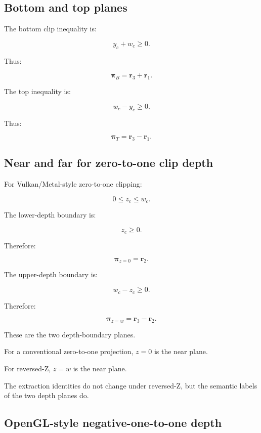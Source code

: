 \subsection{Bottom and top planes}\label{02-foundations-ii-ch034-bottom-and-top-planes}

\hypertarget{02-foundations-ii-ch034-bottom-and-top-planes}{}

The bottom clip inequality is:

\[
 y_c+w_c\ge0.
\]

Thus:

\[
 \boxed{ \boldsymbol\pi_B=\mathbf r_3+\mathbf r_1 }.
\]

The top inequality is:

\[
 w_c-y_c\ge0.
\]

Thus:

\[
 \boxed{ \boldsymbol\pi_T=\mathbf r_3-\mathbf r_1 }.
\]

\subsection{Near and far for zero-to-one clip depth}\label{02-foundations-ii-ch034-near-and-far-for-zero-to-one-clip-depth}

\hypertarget{02-foundations-ii-ch034-near-and-far-for-zero-to-one-clip-depth}{}

For Vulkan/Metal-style zero-to-one clipping:

\[
 0\le z_c\le w_c.
\]

The lower-depth boundary is:

\[
 z_c\ge0.
\]

Therefore:

\[
 \boxed{ \boldsymbol\pi_{z=0}=\mathbf r_2 }.
\]

The upper-depth boundary is:

\[
 w_c-z_c\ge0.
\]

Therefore:

\[
 \boxed{ \boldsymbol\pi_{z=w}=\mathbf r_3-\mathbf r_2 }.
\]

These are the two depth-boundary planes.

For a conventional zero-to-one projection, \(z=0\) is the near plane.

For reversed-Z, \(z=w\) is the near plane.

The extraction identities do not change under reversed-Z, but the semantic labels of the two depth planes do.

\subsection{OpenGL-style negative-one-to-one depth}\label{02-foundations-ii-ch034-opengl-style-negative-one-to-one-depth}


